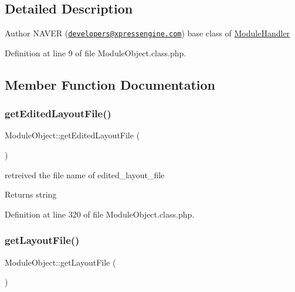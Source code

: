 \subsection{Detailed Description}
\begin{DoxyAuthor}{Author}
N\+A\+V\+ER (\href{mailto:developers@xpressengine.com}{\tt developers@xpressengine.\+com}) base class of \hyperlink{classModuleHandler}{Module\+Handler} 
\end{DoxyAuthor}


Definition at line 9 of file Module\+Object.\+class.\+php.



\subsection{Member Function Documentation}
\mbox{\label{classModuleObject_a14fc83257a1518a1753c50cb11289c27}} 
\subsubsection{\texorpdfstring{get\+Edited\+Layout\+File()}{getEditedLayoutFile()}}
{\footnotesize\ttfamily Module\+Object\+::get\+Edited\+Layout\+File (\begin{DoxyParamCaption}{ }\end{DoxyParamCaption})}

retreived the file name of edited\+\_\+layout\+\_\+file \begin{DoxyReturn}{Returns}
string 
\end{DoxyReturn}


Definition at line 320 of file Module\+Object.\+class.\+php.

\mbox{\label{classModuleObject_af446ac0f9c2a19c2629f30afd6271ec6}} 
\subsubsection{\texorpdfstring{get\+Layout\+File()}{getLayoutFile()}}
{\footnotesize\ttfamily Module\+Object\+::get\+Layout\+File (\begin{DoxyParamCaption}{ }\end{DoxyParamCaption})}

